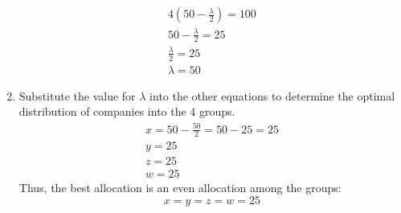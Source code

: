 \documentclass[letterpaper,12pt,fleqn]{article}
\renewcommand{\l}{\lambda}
\begin{document}
\begin{enumerate}[label={\alph*)}]
\begin{gather*}
    4(50-\frac{\l}{2})=100 \\
    50-\frac{\l}{2}=25 \\
    \frac{\l}{2}=25 \\
    \l=50
  \end{gather*}
\item Substitute the value for \(\l\) into the other equations to determine the optimal distribution of companies into the
  4 groups.
  \begin{gather*}
    x=50-\frac{50}{2}=50-25=25 \\
    y=25 \\
    z=25 \\
    w=25
  \end{gather*}
  Thus, the best allocation is an even allocation among the groups:
  \[x=y=z=w=25\]
\end{enumerate}
\end{document}
